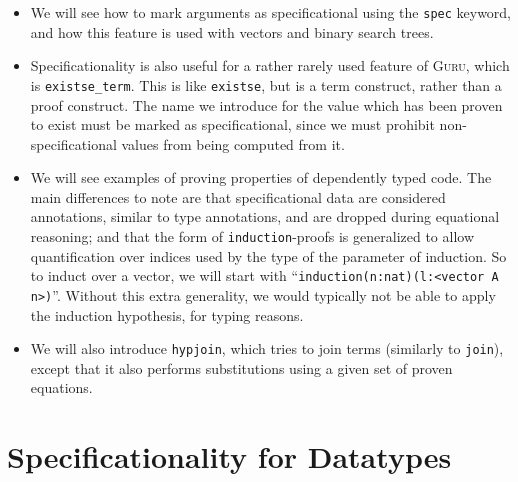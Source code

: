 \documentclass{book}[12pt]
\newcommand{\guru}[0]{\textsc{Guru}\xspace}
\begin{document}
\begin{itemize}

\item We will see how to mark arguments as specificational using the
\texttt{spec} keyword, and how this feature is used with vectors and
binary search trees.

\item Specificationality is also useful for a rather rarely used
feature of \guru, which is \texttt{existse\_term}.  This is like
\texttt{existse}, but is a term construct, rather than a proof
construct.  The name we introduce for the value which has been proven
to exist must be marked as specificational, since we must prohibit
non-specificational values from being computed from it.

\item We will see examples of proving properties of dependently typed
code.  The main differences to note are that specificational data are
considered annotations, similar to type annotations, and are dropped
during equational reasoning; and that the form of
\texttt{induction}-proofs is generalized to allow quantification over
indices used by the type of the parameter of induction.  So to induct
over a vector, we will start with ``\texttt{induction(n:nat)(l:<vector
A n>)}''.  Without this extra generality, we would typically not be
able to apply the induction hypothesis, for typing reasons.

\item We will also introduce \texttt{hypjoin}, which tries to join
terms (similarly to \texttt{join}), except that it also performs
substitutions using a given set of proven equations.

\end{itemize}

\section{Specificationality for Datatypes}
\end{document}
